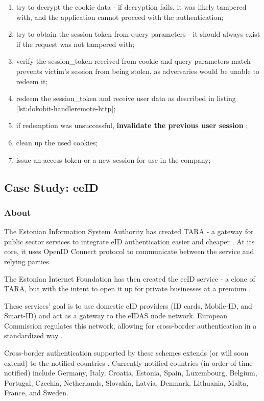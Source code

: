 \begin{enumerate}
  \item try to decrypt the cookie data - if decryption fails, it was likely tampered with, and the application cannot proceed with the authentication;
  \item try to obtain the session token from query parameters - it should always exist if the request was not tampered with;
  \item verify the session\_token received from cookie and query parameters match - prevents victim's session from being stolen, as adversaries would be unable to redeem it;
  \item redeem the session\_token and receive user data as described in listing \ref{lst:dokobit-handleremote-http};
  \item if redemption was unsuccessful, \textbf{invalidate the previous user session} \cite{video-exploitdokobit};
  \item clean up the used cookies;
  \item issue an access token or a new session for use in the company;
\end{enumerate}

\subsection{Case Study: eeID}

\subsubsection{About}

The Estonian Information System Authority has created TARA - a gateway for public sector services to integrate eID authentication easier and cheaper \cite{tara-business}. At its core, it uses OpenID Connect \cite{tara-technical} protocol to communicate between the service and relying parties.

The Estonian Internet Foundation has then created the eeID service - a clone of TARA, but with the intent to open it up for private businesses at a premium \cite{eeid}.

These services' goal is to use domestic eID providers (ID cards, Mobile-ID, and Smart-ID) and act as a gateway to the eIDAS node network. European Commission regulates this network, allowing for cross-border authentication in a standardized way \cite{eulaw-eidas}.

Cross-border authentication supported by these schemes extends (or will soon extend) to the notified countries \cite{eulaw-eidas-notified}. Currently notified countries (in order of time notified) include Germany, Italy, Croatia, Estonia, Spain, Luxembourg, Belgium, Portugal, Czechia, Netherlands, Slovakia, Latvia, Denmark, Lithuania, Malta, France, and Sweden.

